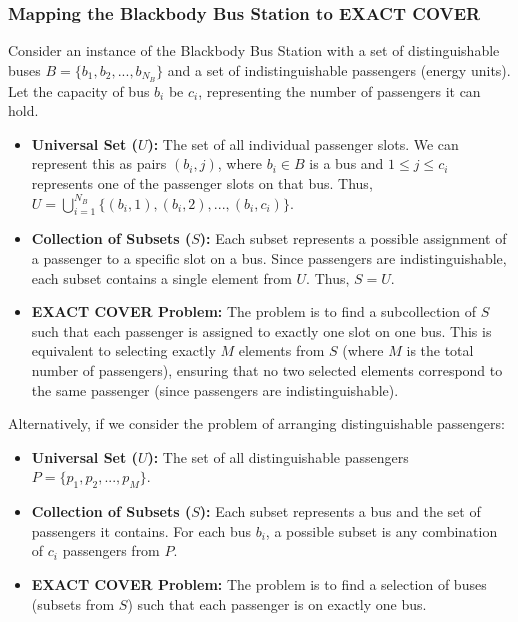 \documentclass{report}
\begin{document}
\subsubsection*{Mapping the Blackbody Bus Station to EXACT COVER}

Consider an instance of the Blackbody Bus Station with a set of distinguishable buses \(B = \{b_1, b_2, ..., b_{N_B}\}\) and a set of indistinguishable passengers (energy units). Let the capacity of bus \(b_i\) be \(c_i\), representing the number of passengers it can hold.

\begin{itemize}
    \item \textbf{Universal Set (\(U\)):} The set of all individual passenger slots. We can represent this as pairs \((b_i, j)\), where \(b_i \in B\) is a bus and \(1 \leq j \leq c_i\) represents one of the passenger slots on that bus. Thus, \(U = \bigcup_{i=1}^{N_B} \{(b_i, 1), (b_i, 2), ..., (b_i, c_i)\}\).

    \item \textbf{Collection of Subsets (\(S\)):}  Each subset represents a possible assignment of a passenger to a specific slot on a bus. Since passengers are indistinguishable, each subset contains a single element from \(U\). Thus, \(S = U\).

    \item \textbf{EXACT COVER Problem:} The problem is to find a subcollection of \(S\) such that each passenger is assigned to exactly one slot on one bus. This is equivalent to selecting exactly \(M\) elements from \(S\) (where \(M\) is the total number of passengers), ensuring that no two selected elements correspond to the same passenger (since passengers are indistinguishable).

\end{itemize}

Alternatively, if we consider the problem of arranging distinguishable passengers:

\begin{itemize}
    \item \textbf{Universal Set (\(U\)):} The set of all distinguishable passengers \(P = \{p_1, p_2, ..., p_M\}\).

    \item \textbf{Collection of Subsets (\(S\)):} Each subset represents a bus and the set of passengers it contains. For each bus \(b_i\), a possible subset is any combination of \(c_i\) passengers from \(P\).

    \item \textbf{EXACT COVER Problem:} The problem is to find a selection of buses (subsets from \(S\)) such that each passenger is on exactly one bus.
\end{itemize}
\end{document}
